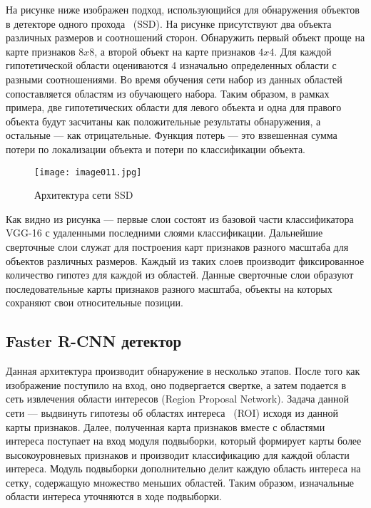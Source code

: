 На рисунке ниже изображен подход, использующийся для обнаружения объектов в детекторе одного прохода ~(SSD). На рисунке присутствуют два объекта различных размеров и соотношений сторон. Обнаружить первый объект проще на карте признаков \(8x8\), а второй объект на карте признаков \(4x4\). Для каждой гипотетической области оцениваются 4 изначально определенных области с разными соотношениями. Во время обучения сети набор из данных областей сопоставляется областям из обучающего набора. Таким образом, в рамках примера, две гипотетических области для левого объекта и одна для правого объекта будут засчитаны как положительные результаты обнаружения, а остальные — как отрицательные. Функция потерь — это взвешенная сумма потери по локализации объекта и потери по классификации объекта.

\begin{figure}[htbp]
\centering
\texttt{[image: image011.jpg]}
\caption{Архитектура сети SSD\cite{fourteen}}%
\label{fig:how-to-do-research}
\end{figure}

Как видно из рисунка — первые слои состоят из базовой части классификатора VGG-16 с удаленными последними слоями классификации. Дальнейшие сверточные слои служат для построения карт признаков разного масштаба для объектов различных размеров. Каждый из таких слоев производит фиксированное количество гипотез для каждой из областей. Данные сверточные слои образуют последовательные карты признаков разного масштаба, объекты на которых сохраняют свои относительные позиции.

\subsection{Faster R-CNN детектор}

Данная архитектура производит обнаружение в несколько этапов. После того как изображение поступило на вход, оно подвергается свертке, а затем подается в сеть извлечения области интересов (Region Proposal Network). Задача данной сети — выдвинуть гипотезы об областях интереса ~(ROI) исходя из данной карты признаков. 
Далее, полученная карта признаков вместе с областями интереса поступает на вход модуля подвыборки, который формирует карты более высокоуровневых признаков и производит классификацию для каждой области интереса. Модуль подвыборки дополнительно делит каждую область интереса на сетку, содержащую множество меньших областей. Таким образом, изначальные области интереса уточняются в ходе подвыборки. 

